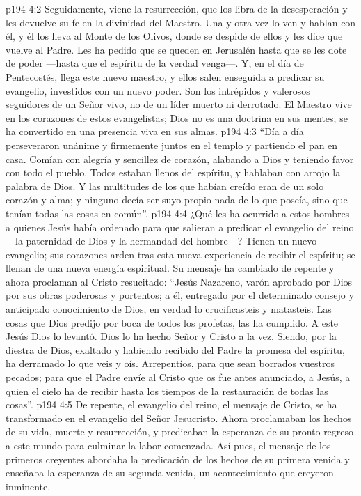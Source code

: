 \vs p194 4:2 Seguidamente, viene la resurrección, que los libra de la desesperación y les devuelve su fe en la divinidad del Maestro. Una y otra vez lo ven y hablan con él, y él los lleva al Monte de los Olivos, donde se despide de ellos y les dice que vuelve al Padre. Les ha pedido que se queden en Jerusalén hasta que se les dote de poder ---hasta que el espíritu de la verdad venga---. Y, en el día de Pentecostés, llega este nuevo maestro, y ellos salen enseguida a predicar su evangelio, investidos con un nuevo poder. Son los intrépidos y valerosos seguidores de un Señor vivo, no de un líder muerto ni derrotado. El Maestro vive en los corazones de estos evangelistas; Dios no es una doctrina en sus mentes; se ha convertido en una presencia viva en sus almas.
\vs p194 4:3 “Día a día perseveraron unánime y firmemente juntos en el templo y partiendo el pan en casa. Comían con alegría y sencillez de corazón, alabando a Dios y teniendo favor con todo el pueblo. Todos estaban llenos del espíritu, y hablaban con arrojo la palabra de Dios. Y las multitudes de los que habían creído eran de un solo corazón y alma; y ninguno decía ser suyo propio nada de lo que poseía, sino que tenían todas las cosas en común”.
\vs p194 4:4 \pc ¿Qué les ha ocurrido a estos hombres a quienes Jesús había ordenado para que salieran a predicar el evangelio del reino ---la paternidad de Dios y la hermandad del hombre---? Tienen un nuevo evangelio; sus corazones arden tras esta nueva experiencia de recibir el espíritu; se llenan de una nueva energía espiritual. Su mensaje ha cambiado de repente y ahora proclaman al Cristo resucitado: “Jesús Nazareno, varón aprobado por Dios por sus obras poderosas y portentos; a él, entregado por el determinado consejo y anticipado conocimiento de Dios, en verdad lo crucificasteis y matasteis. Las cosas que Dios predijo por boca de todos los profetas, las ha cumplido. A este Jesús Dios lo levantó. Dios lo ha hecho Señor y Cristo a la vez. Siendo, por la diestra de Dios, exaltado y habiendo recibido del Padre la promesa del espíritu, ha derramado lo que veis y oís. Arrepentíos, para que sean borrados vuestros pecados; para que el Padre envíe al Cristo que os fue antes anunciado, a Jesús, a quien el cielo ha de recibir hasta los tiempos de la restauración de todas las cosas”.
\vs p194 4:5 De repente, el evangelio del reino, el mensaje de Cristo, se ha transformado en el evangelio del Señor Jesucristo. Ahora proclamaban los hechos de su vida, muerte y resurrección, y predicaban la esperanza de su pronto regreso a este mundo para culminar la labor comenzada. Así pues, el mensaje de los primeros creyentes abordaba la predicación de los hechos de su primera venida y enseñaba la esperanza de su segunda venida, un acontecimiento que creyeron inminente.
